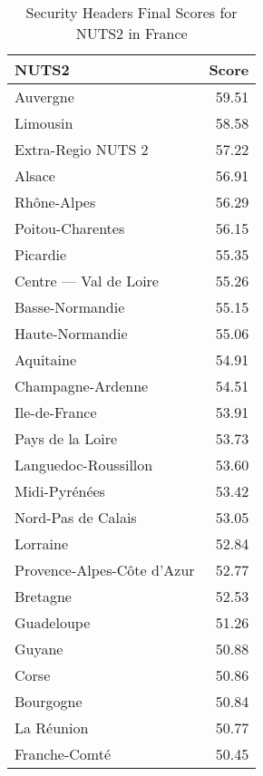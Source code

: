 
    \begin{table}[ht]
        \centering
        \caption{Security Headers Final Scores for NUTS2 in France}
        \label{tab:final_grades_sh_fr}
        \begin{tabular}{lr}
            \toprule
            \textbf{NUTS2} & \textbf{Score} \\
            \midrule
            Auvergne & 59.51 \\
            Limousin & 58.58 \\
            Extra-Regio NUTS 2 & 57.22 \\
            Alsace & 56.91 \\
            Rhône-Alpes & 56.29 \\
            Poitou-Charentes & 56.15 \\
            Picardie & 55.35 \\
            Centre — Val de Loire & 55.26 \\
            Basse-Normandie  & 55.15 \\
            Haute-Normandie  & 55.06 \\
            Aquitaine & 54.91 \\
            Champagne-Ardenne & 54.51 \\
            Ile-de-France & 53.91 \\
            Pays de la Loire & 53.73 \\
            Languedoc-Roussillon & 53.60 \\
            Midi-Pyrénées & 53.42 \\
            Nord-Pas de Calais & 53.05 \\
            Lorraine & 52.84 \\
            Provence-Alpes-Côte d’Azur & 52.77 \\
            Bretagne & 52.53 \\
            Guadeloupe & 51.26 \\
            Guyane & 50.88 \\
            Corse & 50.86 \\
            Bourgogne & 50.84 \\
            La Réunion  & 50.77 \\
            Franche-Comté & 50.45 \\
            \bottomrule
        \end{tabular}
    \end{table}
    